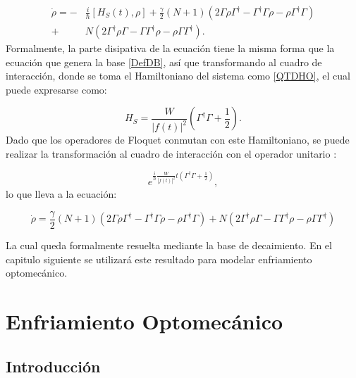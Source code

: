 \documentclass[a4paper,10pt]{report}
\begin{document}
\begin{align*}
\dot{\rho} = -&\frac{i}{\hbar}[H_S (t),\rho] + \frac{\gamma}{2}(N+1)(2\Gamma\rho\Gamma^\dagger - \Gamma^\dagger\Gamma \rho - \rho \Gamma^\dagger \Gamma )\\
 +& N(2\Gamma^\dagger \rho \Gamma - \Gamma \Gamma^\dagger \rho - \rho \Gamma\Gamma^\dagger).
\end{align*} Formalmente, la parte disipativa de la ecuación tiene la misma forma que la ecuación que genera la base \ref{DefDB}, así que transformando al cuadro de interacción, donde se toma el Hamiltoniano del sistema como \ref{QTDHO}, el cual puede expresarse como\cite{BrownPT}:

\begin{equation}
H_S = \frac{W}{|f(t)|^2}(\Gamma^\dagger \Gamma + \frac{1}{2}).
\end{equation} Dado que los operadores de Floquet conmutan con este Hamiltoniano, se puede realizar la transformación al cuadro de interacción con el operador unitario \cite{SakuraiQM}:

\begin{equation}
 e^{\frac{i}{\hbar}\frac{W}{|f(t)|^2}t(\Gamma^\dagger \Gamma + \frac{1}{2})},
\end{equation}lo que lleva a la ecuación:

\begin{equation} \label{GammaLindblat}
\dot{\rho}=\frac{\gamma}{2}(N+1)(2\Gamma\rho\Gamma^\dagger - \Gamma^\dagger\Gamma \rho - \rho \Gamma^\dagger \Gamma )
 + N(2\Gamma^\dagger \rho \Gamma - \Gamma \Gamma^\dagger \rho - \rho \Gamma\Gamma^\dagger)
\end{equation}

La cual queda formalmente resuelta mediante la base de decaimiento. En el capitulo siguiente se utilizará este resultado para modelar enfriamiento optomecánico.


\chapter{Enfriamiento Optomecánico}

\section{Introducción}
\end{document}
